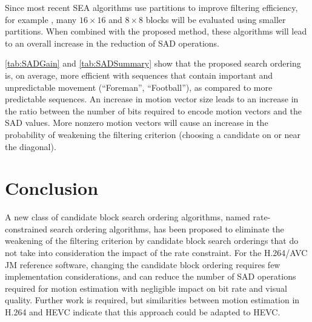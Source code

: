 \documentclass{article}
\begin{document}
Since most recent SEA algorithms use partitions to improve filtering efficiency,
for example \cite{Gao2000, Zhu2005a, Yang2004, Toivonen2004}, many
$16\!\times\!16$ and $8\!\times\!8$ blocks will be evaluated using smaller
partitions. When combined with the proposed method, these algorithms will lead to
an overall increase in the reduction of SAD operations.

\autoref{tab:SADGain} and \ref{tab:SADSummary} show that the proposed search
ordering is, on average, more efficient with sequences that contain important
and unpredictable movement (``Foreman'', ``Football''), as compared to more
predictable sequences. An increase in motion vector size leads to an increase in
the ratio between the number of bits required to encode motion vectors and the
SAD values. More nonzero motion vectors will cause an increase in the
probability of weakening the filtering criterion (choosing a candidate on or
near the diagonal).

\vspace{-1em}
\section{Conclusion}
\label{sec:conclusion}
\vspace{-0.2em}

A new class of candidate block search ordering algorithms, named
rate-constrained search ordering algorithms, has been proposed to eliminate the
weakening of the filtering criterion by candidate block search orderings that do
not take into consideration the impact of the rate constraint. For the H.264/AVC
JM reference software, changing the candidate block ordering requires few
implementation considerations, and can reduce the number of SAD operations
required for motion estimation with negligible impact on bit rate and visual
quality. Further work is required, but similarities between motion estimation in
H.264 and HEVC indicate that this approach could be adapted to HEVC.



\end{document}
